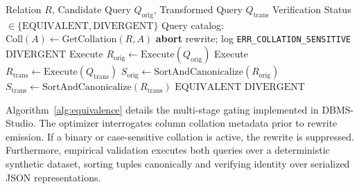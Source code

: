 \documentclass[conference]{IEEEtran}
\begin{document}
\begin{algorithm}[t]
\caption{Collation-Aware Semantic Rewrite Gating}
\label{alg:equivalence}
\begin{algorithmic}[1]
\REQUIRE Relation $R$, Candidate Query $Q_{\text{orig}}$, Transformed Query $Q_{\text{trans}}$
\ENSURE Verification Status $\in \{\text{EQUIVALENT}, \text{DIVERGENT}\}$
\STATE Query catalog: $\text{Coll}(A) \leftarrow \text{GetCollation}(R, A)$
    \STATE \textbf{abort} rewrite; log \texttt{ERR\_COLLATION\_SENSITIVE}
    \RETURN $\text{DIVERGENT}$
\ENDIF
\STATE Execute $R_{\text{orig}} \leftarrow \text{Execute}(Q_{\text{orig}})$
\STATE Execute $R_{\text{trans}} \leftarrow \text{Execute}(Q_{\text{trans}})$
\STATE $S_{\text{orig}} \leftarrow \text{SortAndCanonicalize}(R_{\text{orig}})$
\STATE $S_{\text{trans}} \leftarrow \text{SortAndCanonicalize}(R_{\text{trans}})$
    \RETURN $\text{EQUIVALENT}$
\ELSE
    \RETURN $\text{DIVERGENT}$
\ENDIF
\end{algorithmic}
\end{algorithm}

Algorithm~\ref{alg:equivalence} details the multi-stage gating implemented in DBMS-Studio. The optimizer interrogates column collation metadata prior to rewrite emission. If a binary or case-sensitive collation is active, the rewrite is suppressed. Furthermore, empirical validation executes both queries over a deterministic synthetic dataset, sorting tuples canonically and verifying identity over serialized JSON representations.
\end{document}
